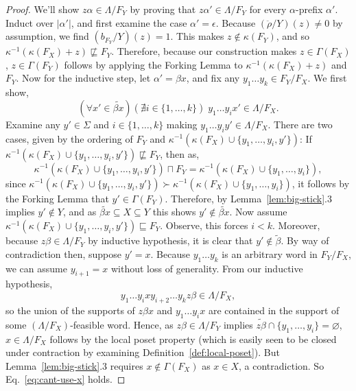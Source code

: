 \documentclass[11pt]{article}
\newcommand{\univ}{\Sigma}
\newcommand{\glang}{\Lambda}
\newcommand{\greedyrep}{\ddot{\rho}}
\begin{document}
\begin{proof}
    We'll show $z\alpha \in \glang/F_Y$ by proving that $z\alpha'\in\glang/F_Y$ for every $\alpha$-prefix $\alpha'$.
    Induct over $|\alpha'|$, and
    first examine the case $\alpha' = \epsilon$.
    Because $\left(\greedyrep/Y\right)(z)\neq 0$ by assumption, we find $\left(b_{F_Y}/Y\right)(z) = 1$.
    This makes $z \notin \kappa(F_Y)$, and so $\kappa^{-1}(\kappa(F_X) + z) \not\sqsubseteq F_Y$.
    Therefore, because our construction makes $z \in \Gamma(F_X)$, $z \in \Gamma(F_Y)$ follows by applying the Forking Lemma to $\kappa^{-1}(\kappa(F_X) + z)$ and $F_Y$.
    Now for the inductive step, let $\alpha' = \beta x$, and fix any $y_1\ldots y_k \in F_Y/F_X$.
    We first show,
    \begin{equation}\label{eq:cant-use-x}
        (\forall x' \in\widetilde{\beta x})(\nexists i \in\{1,\ldots, k\})\;y_1\ldots y_i x' \in\glang/F_X.
    \end{equation}
    Examine any $y' \in \univ$ and $i\in\{1,\ldots, k\}$ making $y_1\ldots y_i y' \in \glang/F_X$.
    There are two cases, given by the ordering of $F_Y$ and $\kappa^{-1}(\kappa(F_X) \cup \{y_1,\ldots, y_i, y'\})$: If $\kappa^{-1}(\kappa(F_X) \cup \{y_1,\ldots, y_i, y'\}) \not\sqsubseteq F_Y$,
    then as,
    \[
        \kappa^{-1}(\kappa(F_X) \cup \{y_1,\ldots, y_i, y'\}) \sqcap F_Y = \kappa^{-1}(\kappa(F_X) \cup \{y_1,\ldots, y_i\}),
    \]
    since $\kappa^{-1}(\kappa(F_X) \cup \{y_1,\ldots, y_i, y'\}) \succ \kappa^{-1}(\kappa(F_X) \cup \{y_1,\ldots, y_i\})$,
    it follows by the Forking Lemma that $y' \in \Gamma(F_Y)$.
    Therefore, by Lemma~\ref{lem:big-stick}.3 implies $y'\notin Y$, and
    as $\widetilde{\beta x}\subseteq X\subseteq Y$ this shows $y'\notin\widetilde{\beta x}$.
    Now assume $\kappa^{-1}(\kappa(F_X) \cup \{y_1,\ldots, y_i, y'\}) \sqsubseteq F_Y$.
    Observe, this forces $i < k$.
    Moreover, because $z\beta \in \glang/F_Y$ by inductive hypothesis, it is clear that $y' \notin \widetilde{\beta}$.
    By way of contradiction then, suppose $y' = x$.
    Because $y_1\ldots y_k$ is an arbitrary word in $F_Y/F_X$, we can assume $y_{i+1} = x$ without loss of generality. 
    From our inductive hypothesis,
    \[
        y_1\ldots y_i x y_{i+2} \ldots y_k z \beta \in \glang/F_X,
    \]
    so the union of the supports of $z\beta x$ and $y_1\ldots y_i x$ are contained in the support of some $(\glang/F_X)$-feasible word.
    Hence, as $z\beta \in \glang/F_Y$ implies $\widetilde{z\beta}\cap\{y_1,\ldots,y_i\} = \varnothing$, $x \in \glang/F_X$ follows by the local poset property (which is easily seen to be closed under contraction by examining Definition~\ref{def:local-poset}).
    But Lemma~\ref{lem:big-stick}.3 requires $x\notin\Gamma(F_X)$ as $x \in X$, a contradiction.
    So Eq.~\ref{eq:cant-use-x} holds.


\end{proof}
\end{document}
